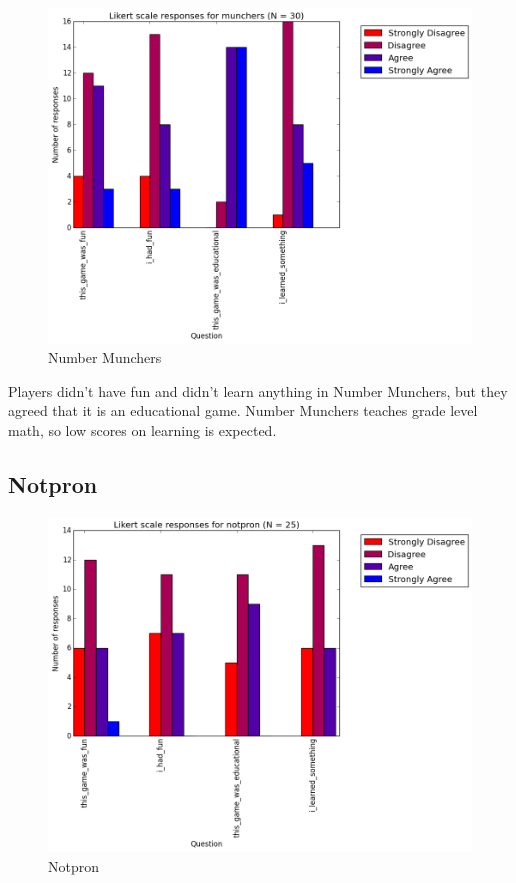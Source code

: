 				\begin{figure}[] 
				\centering 
				\includegraphics[width=\textwidth, height=.4\textheight, keepaspectratio=true]{munchers_likert.png} 
				\caption{Number Munchers}
				\end{figure}

				Players didn't have fun and didn't learn anything in Number Munchers, but they agreed that it is an educational game. Number Munchers teaches grade level math, so low scores on learning is expected.

			\subsection{Notpron}

				\begin{figure}[] 
				\centering 
				\includegraphics[width=\textwidth, height=.4\textheight, keepaspectratio=true]{notpron_likert.png} 
				\caption{Notpron}
				\end{figure}

